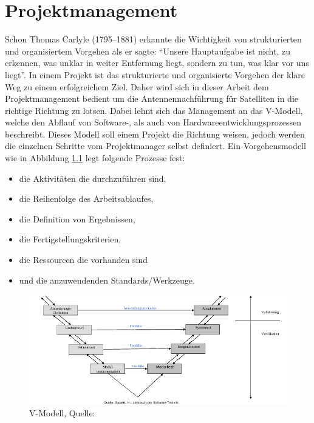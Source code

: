 
\chapter{Projektmanagement}
\label{chap:projekt}
Schon Thomas Carlyle (1795–1881) erkannte die Wichtigkeit von strukturierten und organisiertem Vorgehen als er sagte:\newpar
``Unsere Hauptaufgabe ist nicht, zu erkennen, was unklar in weiter Entfernung liegt, sondern zu tun, was klar vor uns liegt''.\newpar
In einem Projekt ist das strukturierte und organisierte Vorgehen der klare Weg zu einem erfolgreichem Ziel. Daher wird sich in dieser Arbeit
dem Projektmanagement bedient um die Antennennachführung für Satelliten in die richtige Richtung zu lotsen. Dabei lehnt sich das Management an 
das V-Modell, welche den Abflauf von Software-, als auch von Hardwareentwicklungsprozessen beschreibt. Dieses Modell soll einem Projekt 
die Richtung weisen, jedoch werden die einzelnen Schritte vom Projektmanager selbst definiert. Ein Vorgehensmodell wie in Abbildung \ref{fig:vmodell} 
legt folgende Prozesse fest:
\begin{itemize}
 \item die Aktivitäten die durchzuführen sind,
 \item die Reihenfolge des Arbeitsablaufes,
 \item die Definition von Ergebnissen,
 \item die Fertigstellungskriterien,
 \item die Ressourcen die vorhanden sind
 \item und die anzuwendenden Standards/Werkzeuge.
\end{itemize}
\begin{figure}[h]
 \centering
 \includegraphics[width=0.8\linewidth]{./images/vmodell}
 \caption[V-Modell]{V-Modell, Quelle: \cite{swscript}} %
 \label{fig:vmodell}
\end{figure}

